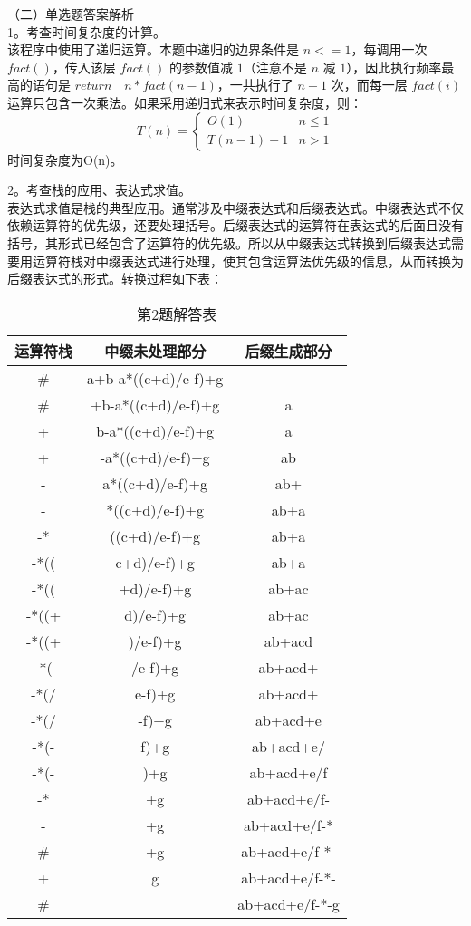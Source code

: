 （二）单选题答案解析\\
1。考查时间复杂度的计算。\\
该程序中使用了递归运算。本题中递归的边界条件是 $n<=1$，每调用一次 $fact()$，传入该层 $fact()$ 的参数值减 $1$（注意不是 $n$ 减 $1$），因此执行频率最高的语句是 $return \quad n*fact(n-1)$，一共执行了 $n-1$ 次，而每一层 $fact(i)$ 运算只包含一次乘法。如果采用递归式来表示时间复杂度，则： \\
\begin{equation}
T(n)= 
\begin{cases}
O(1) & n \le 1\\
T(n-1)+1 & n>1
\end{cases}
\end{equation}
时间复杂度为O(n)。

2。考查栈的应用、表达式求值。\\
表达式求值是栈的典型应用。通常涉及中缀表达式和后缀表达式。中缀表达式不仅依赖运算符的优先级，还要处理括号。后缀表达式的运算符在表达式的后面且没有括号，其形式已经包含了运算符的优先级。所以从中缀表达式转换到后缀表达式需要用运算符栈对中缀表达式进行处理，使其包含运算法优先级的信息，从而转换为后缀表达式的形式。转换过程如下表： \\
\begin{table}[ht]
\centering
\caption{第2题解答表}\label{tab_CSN12_4}
\begin{tabular}{|c|c|c|}
\hline
运算符栈 & 中缀未处理部分 & 后缀生成部分 \\
\hline
\# &a+b-a*((c+d)/e-f)+g & \\
\hline
\# &+b-a*((c+d)/e-f)+g &a \\
\hline
+ &b-a*((c+d)/e-f)+g &a \\
\hline
+ &-a*((c+d)/e-f)+g &ab \\
\hline
- &a*((c+d)/e-f)+g &ab+ \\
\hline
- &*((c+d)/e-f)+g &ab+a \\
\hline
-* &((c+d)/e-f)+g &ab+a \\
\hline
-*(( &c+d)/e-f)+g &ab+a \\
\hline
-*(( &+d)/e-f)+g &ab+ac \\
\hline
-*((+ &d)/e-f)+g &ab+ac \\
\hline
-*((+ &)/e-f)+g &ab+acd \\
\hline
-*( &/e-f)+g &ab+acd+ \\
\hline
-*(/ &e-f)+g &ab+acd+ \\
\hline
-*(/ &-f)+g &ab+acd+e \\
\hline
-*(- &f)+g &ab+acd+e/ \\
\hline
-*(- &)+g &ab+acd+e/f \\
\hline
-* &+g &ab+acd+e/f- \\
\hline
- &+g &ab+acd+e/f-* \\
\hline
\# &+g &ab+acd+e/f-*- \\
\hline
+ &g &ab+acd+e/f-*- \\
\hline
\# &&ab+acd+e/f-*-g \\
\hline
\end{tabular}
\end{table}

